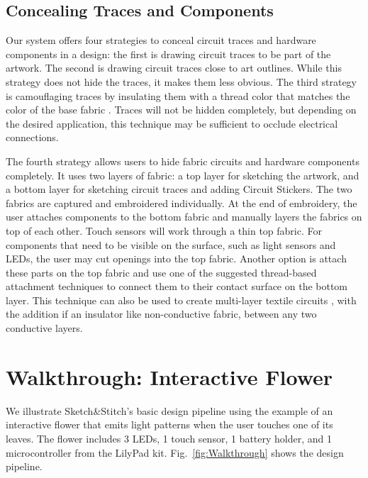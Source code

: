 \documentclass{sigchi}
\begin{document}
\subsection{Concealing Traces and Components}
Our system offers four strategies to conceal circuit traces and hardware components in a design: the first is drawing circuit traces to be part of the artwork. The second is drawing circuit traces close to art outlines. 
While this strategy does not hide the traces, it makes them less obvious. 
The third strategy is camouflaging traces by insulating them with a thread color that matches the color of the base fabric \cite{Buechley2009}. Traces will not be hidden completely, but depending on the desired application, this technique may be sufficient to occlude electrical connections. 

The fourth strategy allows users to hide fabric circuits and hardware components completely. It uses two layers of fabric: a top layer for sketching the artwork, and a bottom layer for sketching circuit traces and adding Circuit Stickers. The two fabrics are captured and embroidered individually. At the end of embroidery, the user attaches components to the bottom fabric and manually layers the fabrics on top of each other. Touch sensors will work through a thin top fabric. For components that need to be visible on the surface, such as light sensors and LEDs, the user may cut openings into the top fabric. Another option is attach these parts on the top fabric and use one of the suggested thread-based attachment techniques to connect them to their contact surface on the bottom layer. This technique can also be used to create multi-layer textile circuits \cite{Dunne:2012:MEC:2370216.2370348, 5387040}, with the addition if an insulator like non-conductive fabric, between any two conductive layers. 







\section{Walkthrough: Interactive Flower}


We illustrate Sketch\&Stitch's basic design pipeline using the example of an interactive flower that emits light patterns when the user touches one of its leaves. The flower includes 3 LEDs, 1 touch sensor, 1 battery holder, and 1 microcontroller 
from the LilyPad kit. Fig.\ \ref{fig:Walkthrough} shows the design pipeline.
\end{document}
